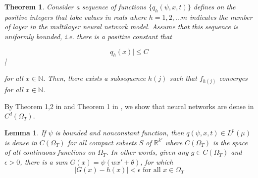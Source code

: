\documentclass{article}
\newtheorem{theorem}{Theorem}[section]
\newtheorem{lemma}{Lemma}[section]
\begin{document}
\begin{theorem}
	Consider a sequence of functions $\{q_{h}(\psi,x,t)\}$ defines on the positive integers that take values in reals where $h = 1,2, \dots m$ indicates the number of layer in the multilayer neural network model. Assume that this sequence is uniformly bounded, i.e. there is a positive constant that 

	\[q_{h}(x)| \leq C\]|
	
	for all $x \in \mathbb{N}$. Then, there exists a subsequence $h(j)$ such that $f_{h(j)}$ converges for all $x \in  \mathbb{N}$.
\end{theorem}
By Theorem 1,2 in \cite{hornik} and Theorem 1 in \cite{cybenko}, we show that neural networks are dense in $C^{d}(\Omega_{T})$.
\begin{lemma}
	If $\psi$ is bounded and nonconstant function, then $q(\psi,x,t)\in L^p(\mu)$ is dense in $C(\Omega_{T})$ for all compact subsets $S$ of $\mathbb{R}^{k'}$ where $C(\Omega_{T})$ is the space of all continuous functions on $\Omega_{T}$. In other words, given any $g \in C(\Omega_{T})$ and $\epsilon > 0$, there is a sum $G(x)=\psi(wx'+\theta)$, for which
	\begin{equation}
	\left|G(x)-h(x)\right| < \epsilon \text{ for all $x\in \Omega_{T}$}
	\end{equation}
	 \label{dense_set}
\end{lemma}
\end{document}
